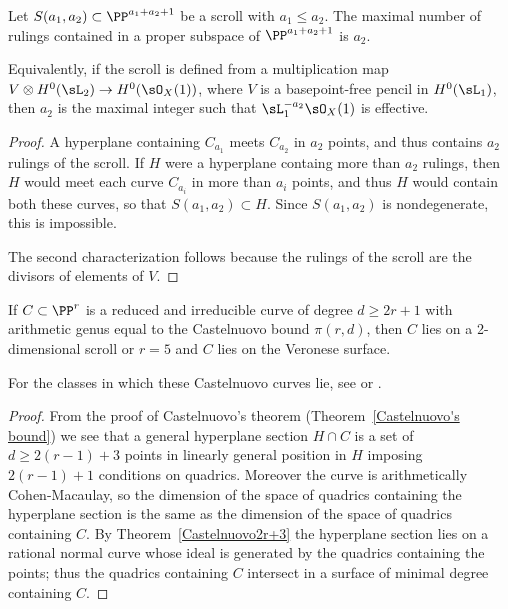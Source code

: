 \begin{proposition}\label{which scroll}
Let $S(a_1,a_2)\subset \PP^{a_1+a_2+1}$ be a scroll with $a_1\leq a_2$. The maximal number of rulings contained in
a proper subspace of $ \PP^{a_1+a_2+1}$ is $a_2$. 

Equivalently, if the scroll is defined from a multiplication
map $V\otimes H^0(\sL_2) \to H^0(\sO_X(1))$, where $V$ is a basepoint-free pencil in $H^0(\sL_1)$,
then $a_2$ is the maximal integer such that $\sL_1^{-a_2}\sO_X(1)$ is effective.
\end{proposition}

\begin{proof}
A hyperplane containing $C_{a_1}$ meets $C_{a_2}$ in $a_2$
points, and thus contains $a_2$ rulings of the scroll. If $H$ were a hyperplane containg more than $a_2$
rulings, then $H$ would meet each curve $C_{a_i}$ in more than $a_i$ points, and thus $H$ would contain
both these curves, so that $S(a_1,a_2)\subset H$. Since $S(a_1,a_2)$ is nondegenerate, this is impossible.

The second characterization follows because the rulings of the scroll are the divisors of elements of $V.$
\end{proof}



\begin{theorem}\label{Castelnuovo examples}
If $C\subset \PP^r$ is a reduced and irreducible curve of degree $d\geq 2r+1$ with arithmetic genus equal to
the
Castelnuovo bound $\pi(r,d)$, then $C$ lies on a 2-dimensional scroll or $r=5$ and $C$ lies on  the Veronese surface.
\end{theorem}

For the classes in which these Castelnuovo curves lie, see \cite[Theorem 3.11]{MR685427} or \cite[p. 533]{Griffiths-Harris1978}.

\begin{proof}
From the proof of Castelnuovo's theorem (Theorem~\ref{Castelnuovo's bound}) we see that a general hyperplane
section $H\cap C$ is a set of $d\geq 2(r-1)+3$ points in linearly general position in $H$ imposing $2(r-1)+1$ conditions on quadrics. Moreover the curve
is arithmetically Cohen-Macaulay, so the dimension of the space of quadrics containing the hyperplane section
is the same as the dimension of the space of quadrics containing $C$. By Theorem~\ref{Castelnuovo2r+3} the hyperplane
section lies on a rational normal curve whose ideal is generated by the quadrics containing the points;
thus the quadrics containing $C$ intersect in a surface of minimal degree containing $C$.
\end{proof}


